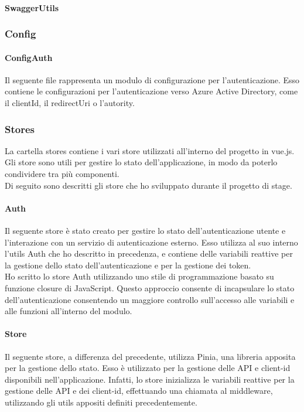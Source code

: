 \paragraph{SwaggerUtils}\label{par:swagger-utils}


\subsubsection{Config}\label{subsubsec:config}
\paragraph{ConfigAuth}\label{par:config-auth}
Il seguente file rappresenta un modulo di configurazione per l'autenticazione. Esso contiene le configurazioni per l'autenticazione verso Azure Active Directory,
come il clientId, il redirectUri o l'autority.  

\subsubsection{Stores}\label{subsubsec:store}
La cartella stores contiene i vari store utilizzati all'interno del progetto in vue.js. Gli store sono utili per gestire lo stato dell'applicazione,
in modo da poterlo condividere tra più componenti.\\
Di seguito sono descritti gli store che ho sviluppato durante il progetto di stage.

\paragraph{Auth}\label{par:auth-store}
Il seguente store è stato creato per gestire lo stato dell'autenticazione utente e l'interazione con un servizio di autenticazione esterno.
Esso utilizza al suo interno l'utils Auth che ho descritto in precedenza, e contiene delle variabili reattive per la gestione dello stato dell'autenticazione
e per la gestione dei token.\\
Ho scritto lo store Auth utilizzando uno stile di programmazione basato su funzione closure di JavaScript. Questo approccio consente di incapsulare
lo stato dell'autenticazione consentendo un maggiore controllo sull'accesso alle variabili e alle funzioni all'interno del modulo.

\paragraph{Store}\label{par:store}
Il seguente store, a differenza del precedente, utilizza Pinia, una libreria apposita per la gestione dello stato.
Esso è utilizzato per la gestione delle API e client-id disponibili nell'applicazione. Infatti, lo store inizializza le variabili reattive per la gestione
delle API e dei client-id, effettuando una chiamata al middleware, utilizzando gli utils appositi definiti precedentemente.

